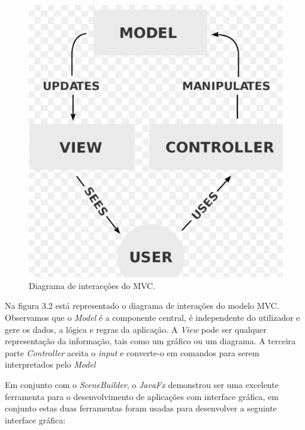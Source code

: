 \vspace{0,07cm}
\begin{figure}[H]
\centering
\includegraphics[scale=0.5]{imagens/mvc.PNG}
\caption{Diagrama de interacções do \ac{MVC}.}
\label{fig:gestao}
\end{figure}

Na figura 3.2 está representado o diagrama de interações do modelo \ac{MVC}. Observamos que o \emph{Model} é a componente central, é independente do utilizador e gere os dados, a lógica e regras da aplicação.
A \emph{View} pode ser qualquer representação da informação, tais como um gráfico ou um diagrama. 
A terceira parte \emph{Controller} aceita o \emph{input} e converte-o em comandos para serem interpretados pelo \emph{Model}


Em conjunto com o \emph{SceneBuilder}, o \emph{JavaFx} demonstrou ser uma excelente ferramenta para o desenvolvimento de aplicações com interface gráfica, em conjunto estas duas ferramentas foram usadas para desenvolver a seguinte interface gráfica: 

